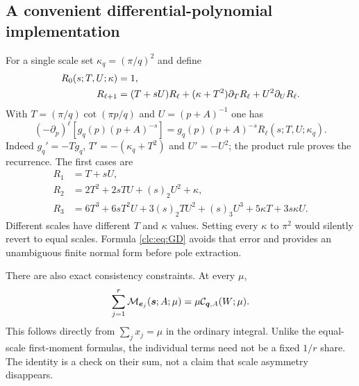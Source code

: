 \subsection{A convenient differential-polynomial implementation}
For a single scale set $\kappa_q=(\pi/q)^2$ and define
\begin{align}
 R_0(s;T,U;\kappa)&=1,\notag\\
 R_{\ell+1}&=(T+sU)R_\ell
       +(\kappa+T^2)\partial_TR_\ell+U^2\partial_UR_\ell.
 \label{clc:eq:Rrec}
\end{align}
With $T=(\pi/q)\cot(\pi p/q)$ and $U=(p+A)^{-1}$ one has
\begin{equation}\label{clc:eq:Ridentity}
 (-\partial_p)^\ell[g_q(p)(p+A)^{-s}]
 =g_q(p)(p+A)^{-s}R_\ell(s;T,U;\kappa_q).
\end{equation}
Indeed $g_q'=-Tg_q$, $T'=-(\kappa_q+T^2)$ and $U'=-U^2$;
the product rule proves the recurrence. The first cases are
\begin{align*}
 R_1&=T+sU,\\
 R_2&=2T^2+2sTU+(s)_2U^2+\kappa,\\
 R_3&=6T^3+6sT^2U+3(s)_2TU^2+(s)_3U^3
                  +5\kappa T+3s\kappa U.
\end{align*}
Different scales have different $T$ and $\kappa$ values. Setting every
$\kappa$ to $\pi^2$ would silently revert to equal scales.
Formula \eqref{clc:eq:GD} avoids that error and provides an unambiguous
finite normal form before pole extraction.

There are also exact consistency constraints. At every $\mu$,
\begin{equation}\label{clc:eq:moment-sum}
 \sum_{j=1}^r\mathcal M_{\boldsymbol e_j}(\boldsymbol s;A;\mu)
       =\mu\mathcal C_{\boldsymbol q,A}(W;\mu).
\end{equation}
This follows directly from $\sum_jx_j=\mu$ in the ordinary integral.
Unlike the equal-scale first-moment formulas, the individual terms need
not be a fixed $1/r$ share. The identity is a check on their sum, not a
claim that scale asymmetry disappears.
